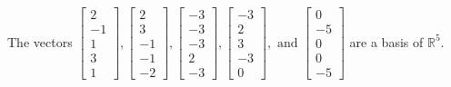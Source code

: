 \begin{exercise}
\begin{exerciseStatement}
  \end{exerciseStatement}
  \begin{exerciseAnswer}
   The vectors \(\left[\begin{array}{r}
2 \\
-1 \\
1 \\
3 \\
1
\end{array}\right] , \left[\begin{array}{r}
2 \\
3 \\
-1 \\
-1 \\
-2
\end{array}\right] , \left[\begin{array}{r}
-3 \\
-3 \\
-3 \\
2 \\
-3
\end{array}\right] , \left[\begin{array}{r}
-3 \\
2 \\
3 \\
-3 \\
0
\end{array}\right] , \text{ and } \left[\begin{array}{r}
0 \\
-5 \\
0 \\
0 \\
-5
\end{array}\right]\) 
  	 are  a basis of \(\mathbb{R}^5\).
  


  \end{exerciseAnswer}
\end{exercise}